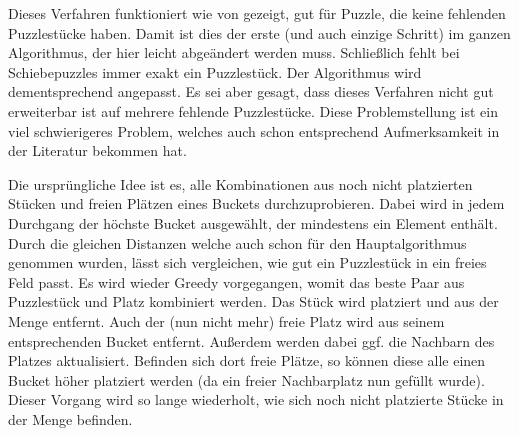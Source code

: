 \documentclass{whswinvcbook}
\begin{document}
Dieses Verfahren funktioniert wie von \cite{gallagher,crisjim} gezeigt, gut für Puzzle, die keine fehlenden Puzzlestücke haben. Damit ist dies der erste (und auch einzige Schritt) im ganzen Algorithmus, der hier leicht abgeändert werden muss. Schließlich fehlt bei Schiebepuzzles immer exakt ein Puzzlestück. Der Algorithmus wird dementsprechend angepasst. Es sei aber gesagt, dass dieses Verfahren nicht gut erweiterbar ist auf mehrere fehlende Puzzlestücke. Diese Problemstellung ist ein viel schwierigeres Problem, welches auch schon entsprechend Aufmerksamkeit in der Literatur bekommen hat. \cite{paikin}

Die ursprüngliche Idee ist es, alle Kombinationen aus noch nicht platzierten Stücken und freien Plätzen eines Buckets durchzuprobieren. Dabei wird in jedem Durchgang der höchste Bucket ausgewählt, der mindestens ein Element enthält. Durch die gleichen Distanzen welche auch schon für den Hauptalgorithmus genommen wurden, lässt sich vergleichen, wie gut ein Puzzlestück in ein freies Feld passt. Es wird wieder Greedy vorgegangen, womit das beste Paar aus Puzzlestück und Platz kombiniert werden. Das Stück wird platziert und aus der Menge entfernt. Auch der (nun nicht mehr) freie Platz wird aus seinem entsprechenden Bucket entfernt. Außerdem werden dabei ggf. die Nachbarn des Platzes aktualisiert. Befinden sich dort freie Plätze, so können diese alle einen Bucket höher platziert werden (da ein freier Nachbarplatz nun gefüllt wurde). Dieser Vorgang wird so lange wiederholt, wie sich noch nicht platzierte Stücke in der Menge befinden.
\end{document}
